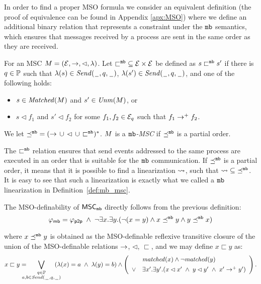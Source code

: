 In order to find a proper MSO formula we consider an equivalent definition (the proof of equivalence can be found in Appendix \ref{apx:MSO}) where  we define
	an additional binary relation that represents a constraint
	under the $\mathtt{mb}$ semantics, which ensures that messages received by a process are sent in the same order as they are received.



\begin{definition} \label{def:n_one_alt}
	For an MSC $M = (\mathcal{E},\to,\lhd,\lambda)$.	Let ${\sqsubset^{\mathtt{mb}}} \subseteq \mathcal{E} \times \mathcal{E}$
	be defined as $s \sqsubset^{\mathtt{mb}} s'$ if there is $q \in \mathbb{P}$
	such that $\lambda(s) \in {\mathit{Send}(\hspace{0.1em}\underline{\hspace{0.5em}}\hspace{0.1em},q,\hspace{0.1em}\underline{\hspace{0.5em}}\hspace{0.1em})}$,
	$\lambda(s') \in {\mathit{Send}(\hspace{0.1em}\underline{\hspace{0.5em}}\hspace{0.1em},q,\hspace{0.1em}\underline{\hspace{0.5em}}\hspace{0.1em})}$, and one of the following holds:
	\begin{itemize}%
		\item $s \in \mathit{Matched}(M)$ and $s' \in \mathit{Unm}(M)$, or
		\item $s \lhd f_1$ and $s' \lhd f_2$ for some $f_1,f_2 \in \mathcal{E}_q$ such that $f_1 \to^+ f_2$.
	\end{itemize}
	
	We let ${\preceq^{\mathtt{mb}}} = ({\to} \,\cup\, {\lhd} \,\cup\, {\sqsubset^{\mathtt{mb}}})^\ast$. 
	$M $ is a \emph{$\mathtt{mb}$-MSC}
	if ${\preceq^{\mathtt{mb}}}$ is a partial order. 
\end{definition}
The ${\sqsubset^{\mathtt{mb}}}$ relation ensures that send events addressed to the same process are executed in an order that is suitable for the $\mathtt{mb}$ communication. If ${\preceq^{\mathtt{mb}}}$ is a partial order, it means that it is possible to find a linearization $\rightsquigarrow$, such that $\rightsquigarrow \;\subseteq\; \preceq^{\mathtt{mb}}$. It is easy to see that such a linearization is exactly what we called a $\mathtt{mb}$ linearization in Definition~\ref{def:mb_msc}. 

The MSO-definability of $\mathsf{MSC}_{\mathtt{mb}}$ directly follows from the previous definition:
\[
	\varphi_{\mathsf{mb}} = \varphi_{\mathsf{p2p}} \;\wedge\; \neg \exists x.\exists y.(\neg (x = y) \wedge x \preceq^{\mathtt{mb}} y \wedge y \preceq^{\mathtt{mb}} x)
\]

where $x \preceq^{\mathtt{mb}} y$ is obtained as the MSO-definable reflexive transitive closure of
the union of the MSO-definable relations $\to$, $\lhd$, $\sqsubset$, and we may define $x \sqsubset y$ as:
\[
x \sqsubset y =
\displaystyle
\hspace{-1em}\bigvee_{\substack{q \in \mathbb{P}\\a,b \in {\mathit{Send}(\hspace{0.1em}\underline{\hspace{0.5em}}\hspace{0.1em},q,\hspace{0.1em}\underline{\hspace{0.5em}}\hspace{0.1em})}}}\hspace{-1em}
(\lambda(x) = a \;\wedge\; \lambda(y) = b)
\wedge
\left(
\begin{array}{rl}
& \mathit{matched}(x) \wedge \neg \mathit{matched}(y)\\[1ex]
\vee & \exists x'.\exists y'. (x \lhd x' \;\wedge\; y \lhd y' \;\wedge\; x' \to^+ y')
\end{array}
\right).
\]



